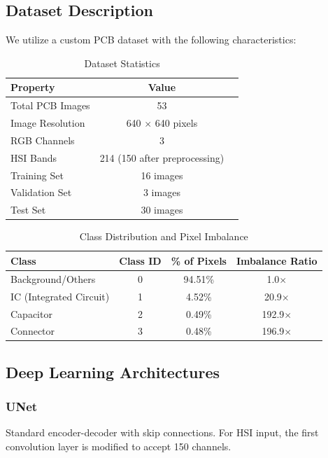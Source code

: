 \documentclass[12pt,a4paper]{article}
\begin{document}
\subsection{Dataset Description}

We utilize a custom PCB dataset with the following characteristics:

\begin{table}[H]
\centering
\caption{Dataset Statistics}
\label{tab:dataset}
\begin{tabular}{lcc}
\toprule
\textbf{Property} & \textbf{Value} \\
\midrule
Total PCB Images & 53 \\
Image Resolution & 640 $\times$ 640 pixels \\
RGB Channels & 3 \\
HSI Bands & 214 (150 after preprocessing) \\
Training Set & 16 images \\
Validation Set & 3 images \\
Test Set & 30 images \\
\bottomrule
\end{tabular}
\end{table}

\begin{table}[H]
\centering
\caption{Class Distribution and Pixel Imbalance}
\label{tab:class_dist}
\begin{tabular}{lccc}
\toprule
\textbf{Class} & \textbf{Class ID} & \textbf{\% of Pixels} & \textbf{Imbalance Ratio} \\
\midrule
Background/Others & 0 & 94.51\% & 1.0$\times$ \\
IC (Integrated Circuit) & 1 & 4.52\% & 20.9$\times$ \\
Capacitor & 2 & 0.49\% & 192.9$\times$ \\
Connector & 3 & 0.48\% & 196.9$\times$ \\
\bottomrule
\end{tabular}
\end{table}

\subsection{Deep Learning Architectures}

\subsubsection{UNet}
Standard encoder-decoder with skip connections. For HSI input, the first convolution layer is modified to accept 150 channels.
\end{document}
